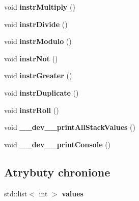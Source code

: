 \begin{CompactItemize}
\item 
\hypertarget{classPCalcStack_0d2b0b03f9a14c875364d4a5dabb6d7a}{
void \textbf{instrMultiply} ()}
\label{classPCalcStack_0d2b0b03f9a14c875364d4a5dabb6d7a}

\item 
\hypertarget{classPCalcStack_f642cacff51d21c2f25487dae1a5b84c}{
void \textbf{instrDivide} ()}
\label{classPCalcStack_f642cacff51d21c2f25487dae1a5b84c}

\item 
\hypertarget{classPCalcStack_bda10d125ac0b2dee9398ce185435fdb}{
void \textbf{instrModulo} ()}
\label{classPCalcStack_bda10d125ac0b2dee9398ce185435fdb}

\item 
\hypertarget{classPCalcStack_5fe0eb9337f3e18416e02c082c14dc66}{
void \textbf{instrNot} ()}
\label{classPCalcStack_5fe0eb9337f3e18416e02c082c14dc66}

\item 
\hypertarget{classPCalcStack_b656cedeb6038c6e3af6e01df21d8c1b}{
void \textbf{instrGreater} ()}
\label{classPCalcStack_b656cedeb6038c6e3af6e01df21d8c1b}

\item 
\hypertarget{classPCalcStack_0424a6bcacc8bee1a5ff074dea87be1e}{
void \textbf{instrDuplicate} ()}
\label{classPCalcStack_0424a6bcacc8bee1a5ff074dea87be1e}

\item 
\hypertarget{classPCalcStack_1be80d765fdc530467d76594d94c6746}{
void \textbf{instrRoll} ()}
\label{classPCalcStack_1be80d765fdc530467d76594d94c6746}

\item 
\hypertarget{classPCalcStack_e28932817d21f528cb3ebe06471df9a2}{
void \textbf{\_\-\_\-dev\_\-\_\-printAllStackValues} ()}
\label{classPCalcStack_e28932817d21f528cb3ebe06471df9a2}

\item 
\hypertarget{classPCalcStack_dbfaddfaadb912324c965390a70ae323}{
void \textbf{\_\-\_\-dev\_\-\_\-printConsole} ()}
\label{classPCalcStack_dbfaddfaadb912324c965390a70ae323}

\end{CompactItemize}
\subsection*{Atrybuty chronione}
\begin{CompactItemize}
\item 
\hypertarget{classPCalcStack_4777b5f859158a71a18deb0bc0978653}{
std::list$<$ int $>$ \textbf{values}}
\label{classPCalcStack_4777b5f859158a71a18deb0bc0978653}

\end{CompactItemize}


